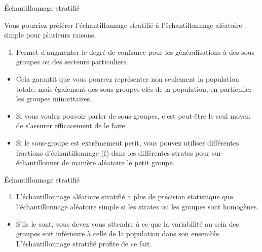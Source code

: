 \documentclass[ignorenonframetext,]{beamer}
\providecommand{\tightlist}{%
  \setlength{\itemsep}{0pt}\setlength{\parskip}{0pt}}
\begin{document}
\begin{frame}{Échantillonnage stratifié}

Vous pourriez préférer l'échantillonnage stratifié à l'échantillonnage
aléatoire simple pour plusieurs raisons.

\begin{enumerate}
\def\labelenumi{\arabic{enumi}.}
\tightlist
\item
  Permet d'augmenter le degré de confiance pour les généralisations à
  des sous-groupes ou des secteurs particuliers.
\end{enumerate}

\begin{itemize}
\tightlist
\item
  Cela garantit que vous pourrez représenter non seulement la population
  totale, mais également des sous-groupes clés de la population, en
  particulier les groupes minoritaires.
\item
  Si vous voulez pouvoir parler de sous-groupes, c'est peut-être le seul
  moyen de s'assurer efficacement de le faire.
\item
  Si le sous-groupe est extrêmement petit, vous pouvez utiliser
  différentes fractions d'échantillonnage (f) dans les différentes
  strates pour sur-échantillonner de manière aléatoire le petit groupe.
\end{itemize}

\end{frame}

\begin{frame}{Échantillonnage stratifié}

\begin{enumerate}
\def\labelenumi{\arabic{enumi}.}
\setcounter{enumi}{1}
\tightlist
\item
  L'échantillonnage aléatoire stratifié a plus de précision statistique
  que l'échantillonnage aléatoire simple si les strates ou les groupes
  sont homogènes.
\end{enumerate}

\begin{itemize}
\tightlist
\item
  S'ils le sont, vous devez vous attendre à ce que la variabilité au
  sein des groupes soit inférieure à celle de la population dans son
  ensemble. L'échantillonnage stratifié profite de ce fait.
\end{itemize}

\end{frame}
\end{document}
